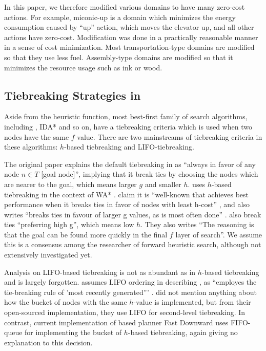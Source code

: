 In this paper, we therefore modified various domains to have many
zero-cost actions.  For example, miconic-up is a domain which minimizes
the energy consumption caused by ``up'' action, which moves the elevator
up, and all other actions have zero-cost.  Modification was done in a
practically reasonable manner in a sense of cost minimization. Most
transportation-type domains are modified so that they use less
fuel. Assembly-type domains are modified so that it minimizes the
resource usage such as ink or wood.  

\subsection{Tiebreaking Strategies in \astar}

Aside from the heuristic function, most best-first family of search
algorithms, including \astar, IDA* and so on, have a tiebreaking criteria which is used
when two nodes have the same $f$ value.
There are two mainstreams of tiebreaking criteria in these algorithms:
$h$-based tiebreaking and LIFO-tiebreaking.

The original \astar paper \cite{hart1968formal} explains the default
tiebreaking in \astar as ``always in favor of any node $n \in T$ [goal
node]'', implying that it break ties by choosing the nodes which are
nearer to the goal, which means larger $g$ and smaller $h$.
\citeauthor{Korf1985depth} uses $h$-based tiebreaking in the context of WA*
\cite{korf1993linear}.  \citeauthor{hansen2007anytime} claim it is
``well-known that \astar achieves best performance when it breaks ties
in favor of nodes with least h-cost'' \cite{hansen2007anytime}, and
\citeauthor{holte2010common} also writes ``\astar breaks ties in favour
of larger g values, as is most often done'' \cite{holte2010common}.
\citeauthor{burns2012implementing} also break ties ``preferring high
g'', which means low $h$. They also writes ``The reasoning is that the
goal can be found more quickly in the final $f$ layer of search''. We
assume this is a consensus among the researcher of forward heuristic
search, although not extensively investigated yet.

Analysis on LIFO-based tiebreaking is not as abundant as in $h$-based
tiebreaking and is largely forgotten.
\citeauthor{Korf1985depth} assumes LIFO ordering in describing \astar,
as ``\astar employes the tie-breaking rule of 'most
recently generated''' \cite{Korf1985depth}.
\citeauthor{burns2012implementing} did not mention anything about how
the bucket of nodes with the same $h$-value is implemented, but from their
open-sourced implementation, they use LIFO for second-level tiebreaking. 
In contrast, current implementation of \sota \astar based planner Fast
Downward \cite{Helmert2006} uses FIFO-queue for implementing the bucket
of $h$-based tiebreaking, again giving no explanation to this decision.


